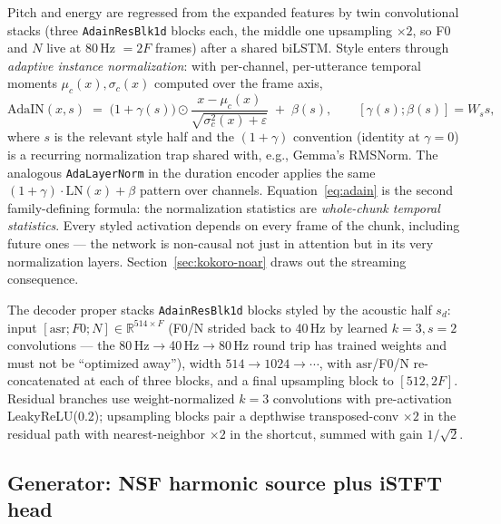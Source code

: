 \documentclass[11pt,a4paper]{article}
\newcommand{\R}{\mathbb{R}}
\newcommand{\code}[1]{\texttt{#1}}
\begin{document}
Pitch and energy are regressed from the expanded features by twin convolutional stacks
(three \code{AdainResBlk1d} blocks each, the middle one upsampling $\times 2$, so F0 and
$N$ live at 80\,Hz $= 2F$ frames) after a shared biLSTM. Style enters through
\emph{adaptive instance normalization}: with per-channel, per-utterance temporal moments
$\mu_c(x), \sigma_c(x)$ computed over the frame axis,
\begin{equation}
\mathrm{AdaIN}(x, s) \;=\; \big(1+\gamma(s)\big)\odot
\frac{x - \mu_c(x)}{\sqrt{\sigma_c^2(x) + \varepsilon}} \;+\; \beta(s),
\qquad [\gamma(s);\beta(s)] = W_s s ,
\label{eq:adain}
\end{equation}
where $s$ is the relevant style half and the $(1+\gamma)$ convention (identity at
$\gamma = 0$) is a recurring normalization trap shared with, e.g., Gemma's RMSNorm.
The analogous \code{AdaLayerNorm} in the duration encoder applies the same
$(1+\gamma)\cdot\mathrm{LN}(x)+\beta$ pattern over channels. Equation~\eqref{eq:adain} is
the second family-defining formula: the normalization statistics are \emph{whole-chunk
temporal statistics}. Every styled activation depends on every frame of the chunk,
including future ones --- the network is non-causal not just in attention but in its very
normalization layers. Section~\ref{sec:kokoro-noar} draws out the streaming consequence.

The decoder proper stacks \code{AdainResBlk1d} blocks styled by the acoustic half $s_d$:
input $[\mathrm{asr}; F0; N] \in \R^{514\times F}$ (F0/N strided back to 40\,Hz by
learned $k{=}3,s{=}2$ convolutions --- the 80\,Hz$\to$40\,Hz$\to$80\,Hz round trip has
trained weights and must not be ``optimized away''), width $514\to1024\to\cdots$, with
$\mathrm{asr}$/F0/N re-concatenated at each of three blocks, and a final upsampling block
to $[512, 2F]$. Residual branches use weight-normalized $k{=}3$ convolutions with
pre-activation LeakyReLU(0.2); upsampling blocks pair a depthwise transposed-conv
$\times2$ in the residual path with nearest-neighbor $\times2$ in the shortcut, summed
with gain $1/\sqrt2$.

\subsection{Generator: NSF harmonic source plus iSTFT head}
\label{sec:kokoro-gen}
\end{document}
